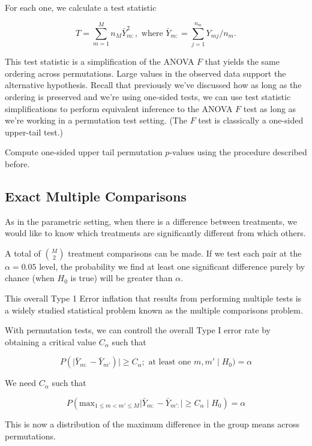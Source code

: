 \documentclass[
  letterpaper,
  DIV=11,
  numbers=noendperiod]{scrreport}
\begin{document}
For each one, we calculate a test statistic

\[T = \sum_{m=1}^M n_M \bar Y^2_{m:}, \text{ where } \bar Y_{m:} = \sum_{j=1}^{n_m} Y_{mj} / n_m. 
\]

This test statistic is a simplification of the ANOVA \(F\) that yields
the same ordering across permutations. Large values in the observed data
support the alternative hypothesis. Recall that previously we've
discussed how as long as the ordering is preserved and we're using
one-sided tests, we can use test statistic simplifications to perform
equivalent inference to the ANOVA \(F\) test as long as we're working in
a permutation test setting. (The \(F\) test is classically a one-sided
upper-tail test.)

Compute one-sided upper tail permutation \(p\)-values using the
procedure described before.

\hypertarget{exact-multiple-comparisons}{%
\subsection{Exact Multiple
Comparisons}\label{exact-multiple-comparisons}}

As in the parametric setting, when there is a difference between
treatments, we would like to know which treatments are significantly
different from which others.

A total of \({ M \choose 2 }\) treatment comparisons can be made. If we
test each pair at the \(\alpha = 0.05\) level, the probability we find
at least one significant difference purely by chance (when \(H_0\) is
true) will be greater than \(\alpha\).

This overall Type 1 Error inflation that results from performing
multiple tests is a widely studied statistical problem known as the
{multiple comparisons problem}.

With permutation tests, we can controll the {overall} Type I error rate
by obtaining a critical value \(C_\alpha\) such that

\[
P(\lvert\bar Y_{m:} - \bar Y_{m'})\rvert \geq C_\alpha; \text{ at least one } m, m' \mid H_0) = \alpha
\]

We need \(C_\alpha\) such that

\[P(\text{max}_{1 \leq m < m' \leq M} \lvert \bar Y_{m:} - \bar Y_{m':} \rvert \geq C_\alpha \mid H_0) = \alpha
\]

This is now a distribution of the maximum difference in the group means
across permutations.
\end{document}
